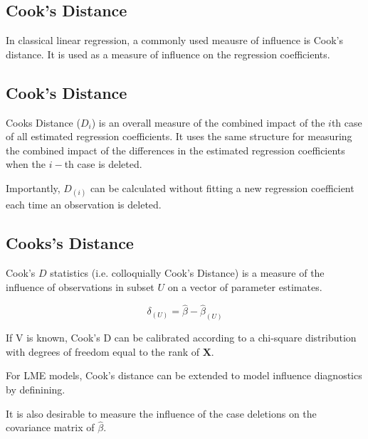 \documentclass[Main.tex]{subfiles}
\begin{document}
	
	\subsection*{Cook's Distance}%
	In classical linear regression, a commonly used meausre of influence is Cook's distance. It is used as a measure of influence on the regression coefficients.
	
	\subsection*{Cook's Distance}%
	Cooks Distance ($D_{i}$) is an overall measure of the combined impact of the $i$th case of all estimated regression coefficients. It uses the same structure for measuring the combined impact of the differences in the estimated regression coefficients when the $i-$th case is deleted.
	
	Importantly, $D_{(i)}$ can be calculated without fitting a new regression coefficient each time an observation is deleted.
	
	
	
	\subsection{Cooks's Distance}%
	 Cook's $D$ statistics (i.e. colloquially Cook's Distance) is a measure of the influence of observations in subset $U$ on a vector of parameter estimates.
	
	\[ \delta_{(U)} = \hat{\beta} - \hat{\beta}_{(U)}\]
	
	If V is known, Cook's D can be calibrated according to a chi-square distribution with degrees of freedom equal to the rank of $\boldsymbol{X}$.
	
	
	
	
	For LME models, Cook's distance can be extended to model influence diagnostics by definining.
	
	
	It is also desirable to measure the influence of the case deletions on the covariance matrix of $\hat{\beta}$.
	
	\newpage
	\newpage
\end{document}

